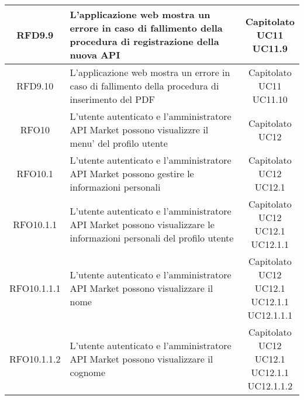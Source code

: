 \begin{longtable}{|c|p{8cm}|c|}
\hypertarget{RFD9.9}{RFD9.9} &  L'applicazione web mostra un errore in caso di fallimento della procedura di registrazione della nuova API & \makecell*{Capitolato\\UC11\\UC11.9} \\
\hline

\hypertarget{RFD9.10}{RFD9.10} &  L'applicazione web mostra un errore in caso di fallimento della procedura di inserimento del PDF & \makecell*{Capitolato\\UC11\\UC11.10} \\
\hline

\hypertarget{RFO10}{RFO10} &  L'utente autenticato e l'amministratore API Market possono visualizzre il menu' del profilo utente & \makecell*{Capitolato\\UC12} \\
\hline

\hypertarget{RFO10.1}{RFO10.1} &  L'utente autenticato e l'amministratore API Market possono gestire le informazioni personali & \makecell*{Capitolato\\UC12\\UC12.1} \\
\hline

\hypertarget{RFO10.1.1}{RFO10.1.1} &  L'utente autenticato e l'amministratore API Market possono visualizzare le informazioni personali del profilo utente &\makecell*{Capitolato\\UC12\\UC12.1\\UC12.1.1} \\
\hline

\hypertarget{RFO10.1.1.1}{RFO10.1.1.1} &  L'utente autenticato e l'amministratore API Market possono visualizzare il nome & \makecell*{Capitolato\\UC12\\UC12.1\\UC12.1.1\\UC12.1.1.1} \\
\hline

\hypertarget{RFO10.1.1.2}{RFO10.1.1.2} &  L'utente autenticato e l'amministratore API Market possono visualizzare il cognome & \makecell*{Capitolato\\UC12\\UC12.1\\UC12.1.1\\UC12.1.1.2} \\
\hline


\end{longtable}

